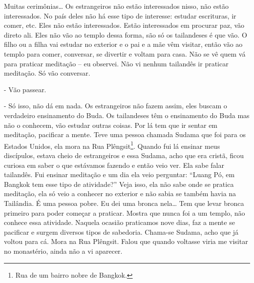 Muitas cerimônias… Os estrangeiros não estão interessados nisso, não
estão interessados. No país deles não há esse tipo de interesse:
estudar escrituras, ir comer, etc. Eles não estão interessados. Estão
interessados em procurar paz, vão direto ali. Eles não vão ao templo
dessa forma, são só os tailandeses é que vão. O filho ou a filha vai
estudar no exterior e o pai e a mãe vêm visitar, então vão ao templo
para comer, conversar, se divertir e voltam para casa. Não se vê quem
vá para praticar meditação – eu observei. Não vi nenhum tailandês ir
praticar meditação. Só vão conversar.

{}- Vão passear.

{}- Só isso, não dá em nada. Os estrangeiros não fazem assim, eles
buscam o verdadeiro ensinamento do Buda. Os tailandeses têm o
ensinamento do Buda mas não o conhecem, vão estudar outras coisas. Por
lá tem que ir sentar em meditação, pacificar a mente. Teve uma pessoa
chamada Sudama que foi para os Estados Unidos, ela mora na Rua
Plêngsit\footnote{Rua de um bairro nobre de Bangkok.}. Quando fui lá
ensinar meus discípulos, estava cheio de estrangeiros e essa Sudama,
acho que era cristã, ficou curiosa em saber o que estávamos fazendo e
então veio ver. Ela sabe falar tailandês. Fui ensinar meditação e um
dia ela veio perguntar: “Luang Pó, em Bangkok tem esse tipo de
atividade?” Veja isso, ela não sabe onde se pratica meditação, ela só
veio a conhecer no exterior e não sabia se também havia na Tailândia. É
uma pessoa pobre. Eu dei uma bronca nela… Tem que levar bronca primeiro
para poder começar a praticar. Mostra que nunca foi a um templo, não
conhece essa atividade. Naquela ocasião praticamos nove dias, faz a
mente se pacificar e surgem diversos tipos de sabedoria. Chama-se
Sudama, acho que já voltou para cá. Mora na Rua Plêngsit. Falou que
quando voltasse viria me visitar no monastério, ainda não a vi
aparecer.

